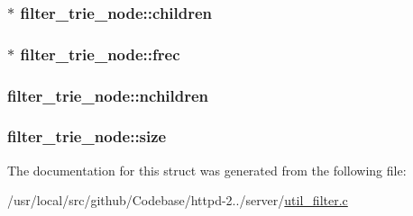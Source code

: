 \subsubsection[{\texorpdfstring{children}{children}}]{$\ast$ filter\+\_\+trie\+\_\+node\+::children}\hypertarget{structfilter__trie__node_a5dba3275ecd0e702026b73a931824339}{}\label{structfilter__trie__node_a5dba3275ecd0e702026b73a931824339}
\subsubsection[{\texorpdfstring{frec}{frec}}]{$\ast$ filter\+\_\+trie\+\_\+node\+::frec}\hypertarget{structfilter__trie__node_aec5a75fedd62b0bf4535853674a5b644}{}\label{structfilter__trie__node_aec5a75fedd62b0bf4535853674a5b644}
\subsubsection[{\texorpdfstring{nchildren}{nchildren}}]{ filter\+\_\+trie\+\_\+node\+::nchildren}\hypertarget{structfilter__trie__node_a2c2c69ffe59b1e2b373d35aa9927e21d}{}\label{structfilter__trie__node_a2c2c69ffe59b1e2b373d35aa9927e21d}
\subsubsection[{\texorpdfstring{size}{size}}]{ filter\+\_\+trie\+\_\+node\+::size}\hypertarget{structfilter__trie__node_a017d42caf30b40603b142ccf92b9a898}{}\label{structfilter__trie__node_a017d42caf30b40603b142ccf92b9a898}


The documentation for this struct was generated from the following file\+:\begin{DoxyCompactItemize}
\item 
/usr/local/src/github/\+Codebase/httpd-\/2../server/\hyperlink{util__filter_8c}{util\+\_\+filter.\+c}\end{DoxyCompactItemize}
